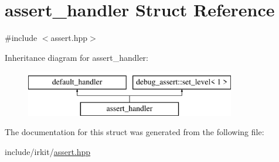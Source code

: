 \hypertarget{structassert__handler}{}\section{assert\+\_\+handler Struct Reference}
\label{structassert__handler}


{\ttfamily \#include $<$assert.\+hpp$>$}

Inheritance diagram for assert\+\_\+handler\+:\begin{figure}[H]
\begin{center}
\leavevmode
\includegraphics[height=2.000000cm]{structassert__handler}
\end{center}
\end{figure}


The documentation for this struct was generated from the following file\+:\begin{DoxyCompactItemize}
\item 
include/irkit/\mbox{\hyperlink{assert_8hpp}{assert.\+hpp}}\end{DoxyCompactItemize}
